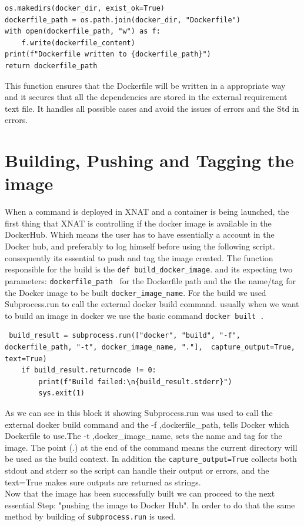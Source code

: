 \begin{lstlisting}
os.makedirs(docker_dir, exist_ok=True)
dockerfile_path = os.path.join(docker_dir, "Dockerfile")
with open(dockerfile_path, "w") as f:
    f.write(dockerfile_content)
print(f"Dockerfile written to {dockerfile_path}")
return dockerfile_path
\end{lstlisting}

This function ensures that the Dockerfile will be written in a appropriate way and it secures that all the dependencies are stored in the external requirement text file. It handles all possible cases and avoid the issues of errors and the Std in errors. 

\section{Building, Pushing and Tagging the image}

When a command is deployed in XNAT and a container is being launched, the first thing that XNAT is controlling if the docker image is available in the DockerHub. Which means the user has to have essentially a account in the Docker hub, and preferably to log himself before using the following script. consequently its essential to push and tag the image created.
The function responsible for the build is the \texttt{def build\_docker\_image}. and its expecting two parameters: 
\texttt{dockerfile\_path } for the Dockerfile path and the the name/tag for the Docker image to be built \texttt{docker\_image\_name}. For the build we used Subprocess.run to call the external docker build command.
usually when we want to build an image in docker we use the basic command \texttt{docker built  .} 


\begin{lstlisting}
 build_result = subprocess.run(["docker", "build", "-f", dockerfile_path, "-t", docker_image_name, "."],  capture_output=True, text=True)
    if build_result.returncode != 0:
        print(f"Build failed:\n{build_result.stderr}")
        sys.exit(1)
\end{lstlisting}

As we can see in this block it showing Subprocess.run was used  to call the external docker build command and the -f ,dockerfile\_path, tells Docker which Dockerfile to use.The  -t ,docker\_image\_name, sets the name and tag for the image. The point (.) at the end of the command means the current directory will be used as the build context. In addition the \texttt{capture\_output=True} collects both stdout and stderr so the script can handle their output or errors, and the text=True makes sure outputs are returned as strings.
\\Now that the image has been successfully built we can proceed to the next essential Step: "pushing the image to Docker Hub". In order to do that the same method by building of \texttt{subprocess.run} is used.


